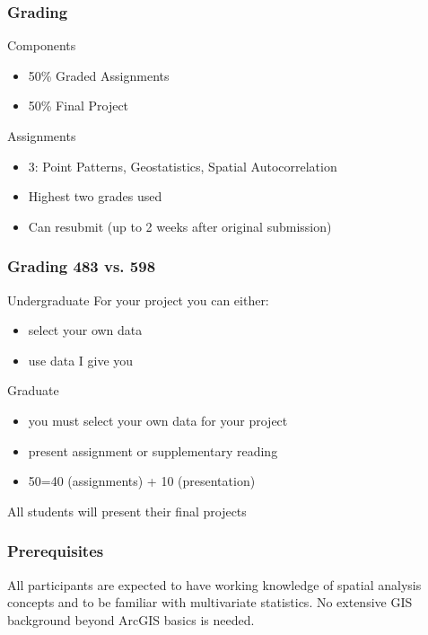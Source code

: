 \documentclass[nototal,handout]{beamer}
\begin{document}
\begin{frame}
	\frametitle{Grading}
 
\begin{block}{Components}
 \begin{itemize}
 \item  50\% Graded Assignments
 \item  50\% Final Project
 \end{itemize}
 \end{block} 
\begin{block}{Assignments}
 \begin{itemize}
 \item  3: Point Patterns, Geostatistics, Spatial Autocorrelation
 \item  Highest two grades used
 \item  Can resubmit (up to 2 weeks after original submission)
 \end{itemize}
 \end{block} \end{frame} 

\begin{frame}
	\frametitle{Grading 483 vs. 598}
 
\begin{block}{Undergraduate}
  For your project you can either:
 \begin{itemize}
 \item  select your own data
 \item  use data I give you
 \end{itemize}
 \end{block} 
\begin{block}{Graduate}
 \begin{itemize}
 \item  you must select your own data for your project
 \item  present assignment or supplementary reading
 \item  50=40 (assignments) + 10 (presentation)
 \end{itemize}
 \end{block} 
\begin{block}{}
  \alert{All students will present their final projects}
 \end{block} \end{frame} 

\begin{frame}
	\frametitle{Prerequisites}
  All participants are expected to have  working knowledge of spatial
  analysis concepts and to be familiar with multivariate statistics. No
  extensive GIS background beyond ArcGIS basics is needed.
 \end{frame} 
\end{document}
